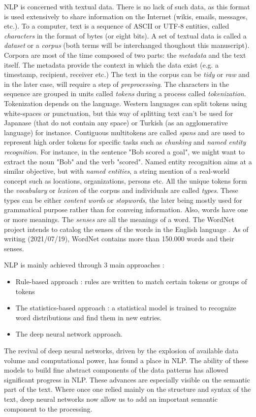 NLP is concerned with textual data.
There is no lack of such data, as this format is used extensively to share information on the Internet (wikis, emails, messages, etc.).
To a computer, text is a sequence of ASCII or UTF-8 entities, called \emph{characters} in the format of bytes (or eight bits).
A set of textual data is called a \emph{dataset} or a \emph{corpus} (both terms will be interchanged thoughout this manuscript).
Corpora are most of the time composed of two parts: the \emph{metadata} and the text itself.
The metadata provide the context in which the data exist (e.g. a timestamp, recipient, receiver etc.)
The text in the corpus can be \emph{tidy} or \emph{raw} and in the later case, will require a step of \emph{preprocessing}.
The characters in the sequence are grouped in units called \emph{tokens} during a process called \emph{tokenization}.
Tokenization depends on the language.
Western languages can split tokens using white-spaces or punctuation, but this way of splitting text can't be used for Japanase (that do not contain any space) or Turkish (as an agglomerative language) for instance.
Contiguous multitokens are called \emph{spans} and are used to represent high order tokens for specific tasks such as \emph{chunking} and \emph{named entity recognition}.
For instance, in the sentence "Bob scored a goal", we might want to extract the noun "Bob" and the verb "scored".
Named entity recognition aims at a similar objective, but with \emph{named entities}, a string mention of a real-world concept such as locations, organizations, persons etc.
All the unique tokens form the \emph{vocabulary} or \emph{lexicon} of the corpus and individuals are called \emph{types}.
These types can be either \emph{content words} or \emph{stopwords}, the later being mostly used for grammatical purpose rather than for conveing information.
Also, words have one or more meanings.
The \emph{senses} are all the meanings of a word.
The WordNet project intends to catalog the senses of the words in the English language \cite{millerWordNetLexicalDatabase1995}.
As of writing (2021/07/19), WordNet contains more than 150.000 words and their senses.

NLP is mainly achieved through 3 main approaches \cite{hirschbergAdvancesNaturalLanguage2015}:
\begin{itemize}
    \item Rule-based approach : rules are written to match certain tokens or groups of tokens
    \item The statistics-based approach : a statistical model is trained to recognize word distributions and find them in new entries.
    \item The deep neural network approach.
\end{itemize}
The revival of deep neural networks, driven by the explosion of available data volume and computational power, has found a place in NLP.
The ability of these models to build fine abstract components of the data patterns has allowed significant progress in NLP.
These advances are especially visible on the semantic part of the text.
Where once one relied mainly on the structure and syntax of the text, deep neural networks now allow us to add an important semantic component to the processing.

